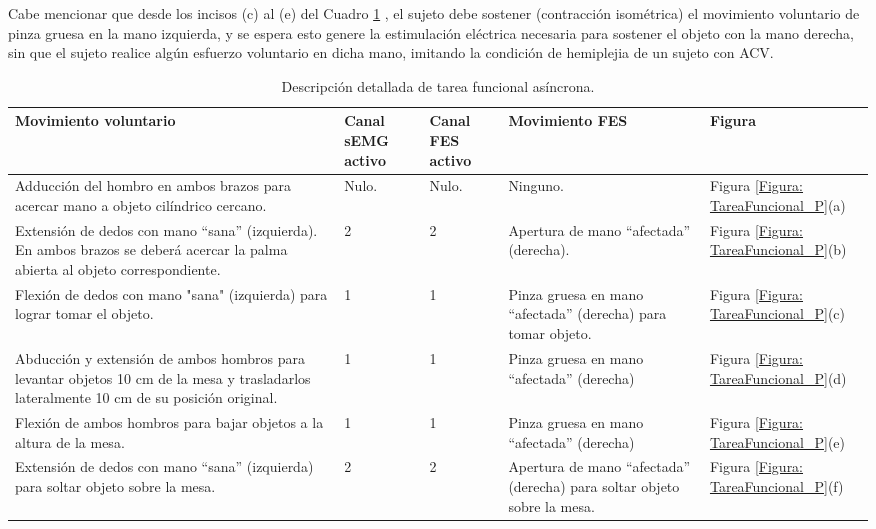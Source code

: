 Cabe mencionar que desde los incisos (c) al (e) del Cuadro \ref{Cuadro:TareaFunAsin} , el sujeto debe sostener (contracción isométrica) el movimiento voluntario de pinza gruesa en la mano izquierda, y se espera esto genere la estimulación eléctrica necesaria para sostener el objeto con la mano derecha, sin que el sujeto realice algún esfuerzo voluntario en dicha mano, imitando la condición de hemiplejia de un sujeto con ACV.

\begin{table}[htbp]
	\centering
	\begin{tabular}{|p{5cm}|p{1.4cm}|p{1.4cm}|p{3.5cm}|p{1.5cm}|}
	\hline
	\textbf{Movimiento voluntario} & \textbf{Canal sEMG activo} & \textbf{Canal FES activo} & \textbf{Movimiento FES} & \textbf{Figura}\\ \hline \hline
	Adducción del hombro en ambos brazos para acercar mano a objeto cilíndrico cercano. & Nulo. & Nulo. & Ninguno. & Figura \ref{Figura: TareaFuncional_P}(a)\\ \hline
	Extensión de dedos con mano ``sana'' (izquierda). En ambos brazos se deberá acercar la palma abierta al objeto correspondiente. & 2 & 2 & Apertura de mano ``afectada'' (derecha). & Figura \ref{Figura: TareaFuncional_P}(b)\\ \hline
	Flexión de dedos con mano "sana" (izquierda) para lograr tomar el objeto. & 1 & 1 & Pinza gruesa en mano ``afectada'' (derecha) para tomar objeto. & Figura \ref{Figura: TareaFuncional_P}(c)\\ \hline
	Abducción y extensión de ambos hombros para levantar objetos 10 cm de la mesa y trasladarlos lateralmente 10 cm de su posición original. & 1 & 1 & Pinza gruesa en mano ``afectada'' (derecha) & Figura \ref{Figura: TareaFuncional_P}(d)\\ \hline
	Flexión de ambos hombros para bajar objetos a la altura de la mesa. & 1 & 1 & Pinza gruesa en mano ``afectada'' (derecha) & Figura \ref{Figura: TareaFuncional_P}(e)\\ \hline
	Extensión de dedos con mano ``sana'' (izquierda) para soltar objeto sobre la mesa. & 2 & 2 & Apertura de mano ``afectada'' (derecha) para soltar objeto sobre la mesa. & Figura \ref{Figura: TareaFuncional_P}(f)\\ \hline
	\end{tabular}
	\caption{Descripción detallada de tarea funcional asíncrona.}
	\label{Cuadro:TareaFunAsin}
\end{table}

